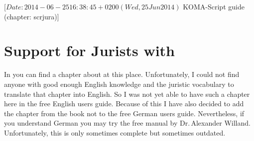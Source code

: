 %
%
%
%
%
%
%
%
% 
%
%
%
%


                 [$Date: 2014-06-25 16:38:45 +0200 (Wed, 25 Jun 2014) $
                  KOMA-Script guide (chapter: scrjura)]

\chapter{Support for Jurists with }

In \cite{book:komascript} you can find a chapter about  at
this place. Unfortunately, I could not find anyone with good enough English
knowledge and the juristic vocabulary to translate that chapter into
English. So I was not yet able to have such a chapter here in the free English
users guide. Because of this I have also decided to add the chapter from
the book not to the free German users guide. Nevertheless, if you understand
German you may try the free manual by Dr.\,Alexander Willand. Unfortunately,
this is only sometimes complete but sometimes outdated.%
%

